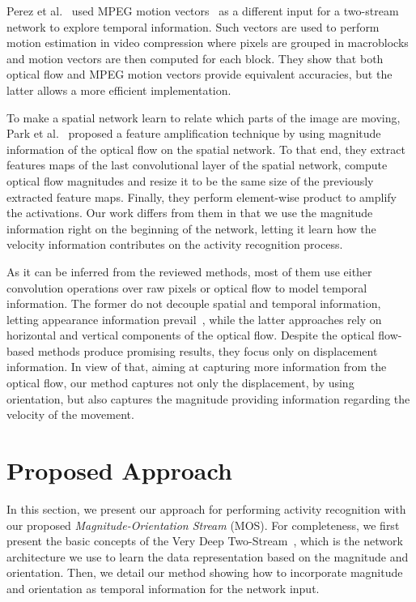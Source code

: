 \documentclass[10pt,conference]{IEEEtran}
\begin{document}
Perez et al.~\cite{Perez:2017} used MPEG motion vectors~\cite{Richardson:2003} as a different input for a two-stream network to explore temporal information. Such vectors are used to perform motion estimation in video compression where pixels are grouped in macroblocks and motion vectors are then computed for each block. They show that both optical flow and MPEG motion vectors provide equivalent accuracies, but the latter allows a more efficient implementation.


To make a spatial network learn to relate which parts of the image are moving, Park et al.~\cite{Park:2016} proposed a feature amplification technique by using magnitude information of the optical flow on the spatial network. To that end, they extract features maps of the last convolutional layer of the spatial network, compute optical flow magnitudes and resize it to be the same size of the previously extracted feature maps. Finally, they perform element-wise product to amplify the activations. Our work differs from them in that we use the magnitude information right on the beginning of the network, letting it learn how the velocity information contributes on the activity recognition process.

As it can be inferred from the reviewed methods, most of them use either convolution operations over raw pixels or optical flow to model temporal information. The former do not decouple spatial and temporal information, letting appearance information prevail~\cite{Feichtenhofer:2016}, while the latter approaches rely on horizontal and vertical components of the optical flow. Despite the optical flow-based methods produce promising results, they focus only on displacement information. In view of that, aiming at capturing more information from the optical flow, our method captures not only the displacement, by using orientation, but also captures the magnitude providing information regarding the velocity of the movement.

\section{Proposed Approach}\label{approach}


In this section, we present our approach for performing activity recognition with our proposed \emph{Magnitude-Orientation Stream} (MOS). For completeness, we first present the basic concepts of the Very Deep Two-Stream~\cite{Wang:2015}, which is the network architecture we use to learn the data representation based on the magnitude and orientation. Then, we detail our method showing how to incorporate magnitude and orientation as temporal information for the network input.
\end{document}
